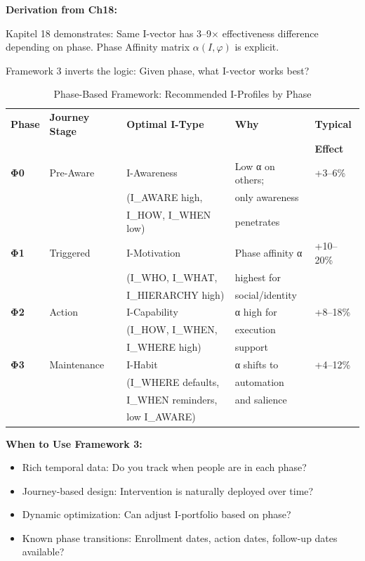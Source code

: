 \textbf{Derivation from Ch18:}

Kapitel 18 demonstrates: Same I-vector has 3--9$\times$ effectiveness difference depending on phase. Phase Affinity matrix $\alpha(I, \varphi)$ is explicit.

Framework 3 inverts the logic: Given phase, what I-vector works best?

\begin{table}[htbp]
\centering
\caption{Phase-Based Framework: Recommended I-Profiles by Phase}
\label{tab:20-f3-phases}
\renewcommand{\arraystretch}{1.4}
\footnotesize
\begin{tabular}{@{}lllll@{}}
\toprule
\textbf{Phase} & \textbf{Journey Stage} & \textbf{Optimal I-Type} & \textbf{Why} & \textbf{Typical} \\
& & & & \textbf{Effect} \\
\midrule
\textbf{Φ0} & Pre-Aware & I-Awareness & Low α on others; & +3--6\% \\
& & (I\_AWARE high, & only awareness & \\
& & I\_HOW, I\_WHEN low) & penetrates & \\
\midrule
\textbf{Φ1} & Triggered & I-Motivation & Phase affinity α & +10--20\% \\
& & (I\_WHO, I\_WHAT, & highest for & \\
& & I\_HIERARCHY high) & social/identity & \\
\midrule
\textbf{Φ2} & Action & I-Capability & α high for & +8--18\% \\
& & (I\_HOW, I\_WHEN, & execution & \\
& & I\_WHERE high) & support & \\
\midrule
\textbf{Φ3} & Maintenance & I-Habit & α shifts to & +4--12\% \\
& & (I\_WHERE defaults, & automation & \\
& & I\_WHEN reminders, & and salience & \\
& & low I\_AWARE) & \\
\bottomrule
\end{tabular}
\end{table}

\textbf{When to Use Framework 3:}
\begin{itemize}[nosep]
\item Rich temporal data: Do you track when people are in each phase?
\item Journey-based design: Intervention is naturally deployed over time?
\item Dynamic optimization: Can adjust I-portfolio based on phase?
\item Known phase transitions: Enrollment dates, action dates, follow-up dates available?
\end{itemize}

